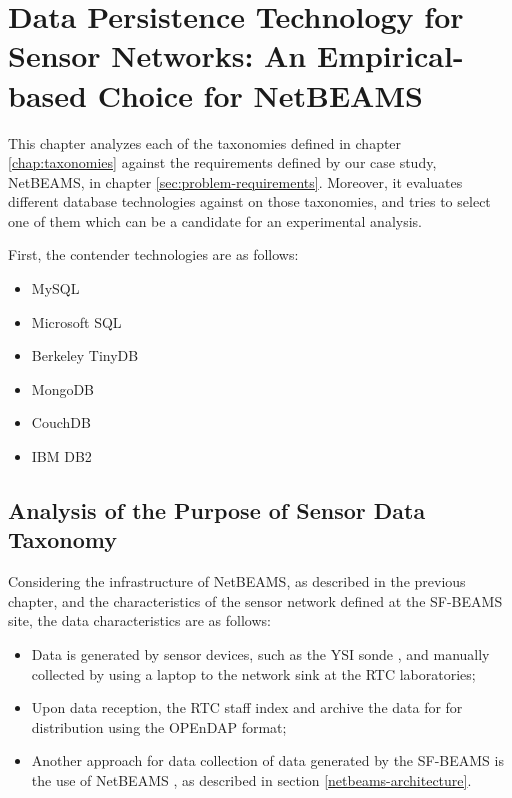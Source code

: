

\chapter{Data Persistence Technology for Sensor Networks: An Empirical-based
Choice for NetBEAMS}

This chapter analyzes each of the taxonomies defined in chapter
\ref{chap:taxonomies} against the requirements defined by our case study,
NetBEAMS, in chapter \ref{sec:problem-requirements}. Moreover, it evaluates
different database technologies against on those taxonomies, and tries to select
one of them which can be a candidate for an experimental analysis.

First, the contender technologies are as follows:

\begin{itemize}
  \item MySQL
  \item Microsoft SQL 
  \item Berkeley TinyDB
  \item MongoDB
  \item CouchDB
  \item IBM DB2
\end{itemize}


\section{Analysis of the Purpose of Sensor Data Taxonomy}

Considering the infrastructure of NetBEAMS, as described in the previous
chapter, and the characteristics of the sensor network defined at the SF-BEAMS
\cite{sfbeams2006} site, the data characteristics are as follows:

\begin{itemize}
  \item Data is generated by sensor devices, such as the YSI sonde
  \cite{YSI-Sonde}, and manually collected by using a laptop to the network
  sink at the RTC laboratories;
  \item Upon data reception, the RTC staff index and archive the data for
  for distribution using the OPEnDAP format;
  \item Another approach for data collection of data generated by the SF-BEAMS
  is the use of NetBEAMS \cite{netbeams2009}, as described in section
  \ref{netbeams-architecture}.
\end{itemize}

